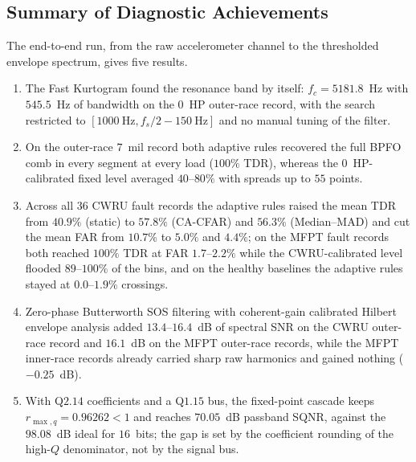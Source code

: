 \subsection{Summary of Diagnostic Achievements}
The end-to-end run, from the raw accelerometer channel to the thresholded
envelope spectrum, gives five results.
\begin{enumerate}
  \item The Fast Kurtogram found the resonance band by itself: $f_c=5181.8$~Hz
        with $545.5$~Hz of bandwidth on the $0$~HP outer-race record, with the
        search restricted to $[1000~\text{Hz}, f_s/2-150~\text{Hz}]$ and no
        manual tuning of the filter.
  \item On the outer-race $7$~mil record both adaptive rules recovered the full
        BPFO comb in every segment at every load ($100\%$ TDR), whereas the
        $0$~HP-calibrated fixed level averaged $40$--$80\%$ with spreads up to
        $55$ points.
  \item Across all $36$ CWRU fault records the adaptive rules raised the mean
        TDR from $40.9\%$ (static) to $57.8\%$ (CA-CFAR) and $56.3\%$
        (Median--MAD) and cut the mean FAR from $10.7\%$ to $5.0\%$ and
        $4.4\%$; on the MFPT fault records both reached $100\%$ TDR at FAR
        $1.7$--$2.2\%$ while the CWRU-calibrated level flooded $89$--$100\%$ of
        the bins, and on the healthy baselines the adaptive rules stayed at
        $0.0$--$1.9\%$ crossings.
  \item Zero-phase Butterworth SOS filtering with coherent-gain calibrated
        Hilbert envelope analysis added $13.4$--$16.4$~dB of spectral SNR on
        the CWRU outer-race record and $16.1$~dB on the MFPT outer-race
        records, while the MFPT inner-race records already carried sharp raw
        harmonics and gained nothing ($-0.25$~dB).
  \item With Q$2.14$ coefficients and a Q$1.15$ bus, the fixed-point cascade
        keeps $r_{\max,q}=0.96262<1$ and reaches $70.05$~dB passband SQNR,
        against the $98.08$~dB ideal for $16$~bits; the gap is set by the
        coefficient rounding of the high-$Q$ denominator, not by the signal
        bus.
\end{enumerate}

